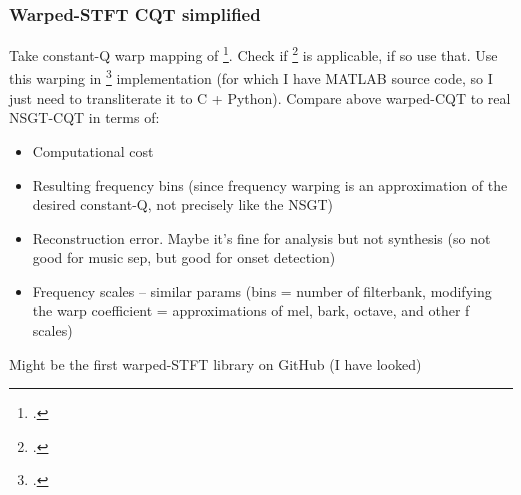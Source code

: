 \documentclass[usenames,dvipsnames]{beamer}
\begin{document}
\begin{frame}
	\frametitle{Warped-STFT CQT simplified}
	Take constant-Q warp mapping of \footcite{cqwarp}. Check if \footcite{betterwarp} is applicable, if so use that. Use this warping in \footcite{makur2008} implementation (for which I have MATLAB source code, so I just need to transliterate it to C + Python). 
	Compare above warped-CQT to real NSGT-CQT in terms of:
	\begin{itemize}
		\item
			Computational cost
		\item
			Resulting frequency bins (since frequency warping is an approximation of the desired constant-Q, not precisely like the NSGT)
		\item
			Reconstruction error. Maybe it's fine for analysis but not synthesis (so not good for music sep, but good for onset detection)
		\item
			Frequency scales -- similar params (bins = number of filterbank, modifying the warp coefficient = approximations of mel, bark, octave, and other f scales)
	\end{itemize}
	Might be the first warped-STFT library on GitHub (I have looked)
\end{frame}
\end{document}
